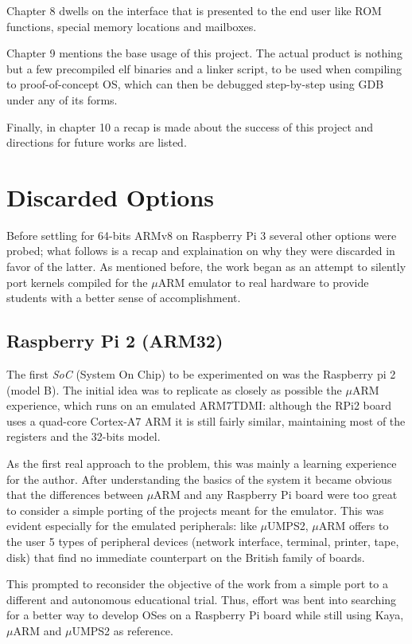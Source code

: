 \documentclass[12pt,a4paper,openright,twoside]{report}
\begin{document}
Chapter 8 dwells on the interface that is presented to the end user like ROM 
functions, special memory locations and mailboxes.

Chapter 9 mentions the base usage of this project. The actual product is nothing
but a few precompiled elf binaries and a linker script, to be used when compiling
to proof-of-concept OS, which can then be debugged step-by-step using GDB under
any of its forms.

Finally, in chapter 10 a recap is made about the success of this project and directions
for future works are listed.

\clearpage{\pagestyle{empty}\cleardoublepage}
\chapter{Discarded Options}
Before settling for 64-bits ARMv8 on Raspberry Pi 3 several other options were 
probed; what follows is a recap and explaination on why they were discarded
in favor of the latter. As mentioned before, the work began as an attempt to
silently port kernels compiled for the $\mu$ARM emulator to real hardware to 
provide students with a better sense of accomplishment.

\section{Raspberry Pi 2 (ARM32)}
The first \textit{SoC} (System On Chip) to be experimented on was the Raspberry pi 2 (model B).
 The initial idea was to replicate as closely as possible the
$\mu$ARM experience, which runs on an emulated ARM7TDMI: although the RPi2 
board uses a quad-core Cortex-A7 ARM it is still fairly similar, maintaining most
of the registers and the 32-bits model.

As the first real approach to the problem, this was mainly a learning experience
for the author. After understanding the basics of the system it became
obvious that the differences between $\mu$ARM and any Raspberry Pi board were 
too great to consider a simple porting of the projects meant for the emulator.
This was evident especially for the emulated peripherals: like $\mu$UMPS2, $\mu$ARM offers
to the user 5 types of peripheral devices (network interface, terminal, printer,
tape, disk) that find no immediate counterpart on the British family of boards.

This prompted to reconsider the objective of the work from a simple port to
a different and autonomous educational trial. Thus, effort was bent into searching
for a better way to develop OSes on a Raspberry Pi board while still using
Kaya, $\mu$ARM and $\mu$UMPS2 as reference.
\end{document}
